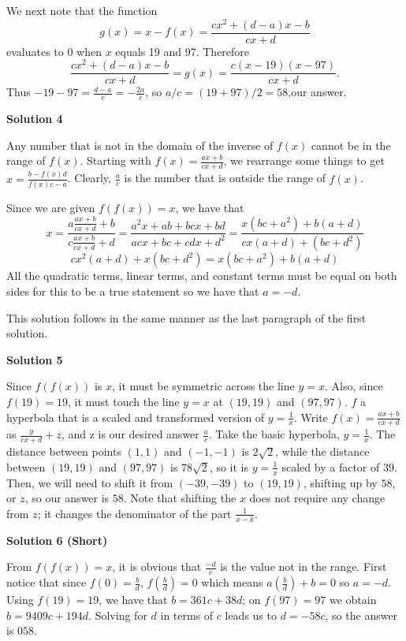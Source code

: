 \begin{enumerate}
 We next note that the function
 \[g(x) =  x - f(x) = \frac{c x^2 + (d-a) x - b}{cx + d}\]evaluates to 0 when $x$ equals 19 and 97.  Therefore
 \[\frac{c x^2 + (d-a) x - b}{cx+d} = g(x) = \frac{c(x-19)(x-97)}{cx+d}.\]Thus $-19 - 97 = \frac{d-a}{c} = -\frac{2a}{c}$, so $a/c = (19+97)/2 = 58$,our answer.

 



\textbf{Solution 4}

Any number that is not in the domain of the inverse of $f(x)$ cannot be in the range of $f(x)$. Starting with $f(x) = \frac{ax+b}{cx+d}$, we rearrange some things to get $x = \frac{b-f(x)d}{f(x)c-a}$. Clearly, $\frac{a}{c}$ is the number that is outside the range of $f(x)$.

 
Since we are given $f(f(x))=x$, we have that 
 \[x = \frac{a\frac{ax+b}{cx+d}+b}{c\frac{ax+b}{cx+d}+d} = \frac{a^2x +ab+bcx+bd}{acx+bc+cdx+d^2} = \frac{x(bc+a^2)+b(a+d)}{cx(a+d)+(bc+d^2)}\]
 \[cx^2(a+d)+x(bc+d^2) = x(bc+a^2) + b(a+d)\]All the quadratic terms, linear terms, and constant terms must be equal on both sides for this to be a true statement so we have that $a = -d$.

 This solution follows in the same manner as the last paragraph of the first solution.

 



\textbf{Solution 5}

Since $f(f(x))$ is $x$, it must be symmetric across the line $y=x$. Also, since $f(19)=19$, it must touch the line $y=x$ at $(19,19)$ and $(97,97)$. $f$ a hyperbola that is a scaled and transformed version of $y=\frac{1}{x}$. Write $f(x)= \frac{ax+b}{cx+d}$ as $\frac{y}{cx+d}+z$, and z is our desired answer $\frac{a}{c}$. Take the basic hyperbola, $y=\frac{1}{x}$. The distance between points $(1,1)$ and $(-1,-1)$ is $2\sqrt{2}$, while the distance between $(19,19)$ and $(97,97)$ is $78\sqrt{2}$, so it is $y=\frac{1}{x}$ scaled by a factor of $39$. Then, we will need to shift it from $(-39,-39)$ to $(19,19)$, shifting up by $58$, or $z$, so our answer is $\boxed{58}$. Note that shifting the $x$ does not require any change from $z$; it changes the denominator of the part $\frac{1}{x-k}$.

 



\textbf{Solution 6 (Short)}

From $f(f(x))=x$, it is obvious that $\frac{-d}{c}$ is the value not in the range. First notice that since $f(0)=\frac{b}{d}$, $f(\frac{b}{d})=0$ which means $a(\frac{b}{d})+b=0$ so $a=-d$. Using $f(19)=19$, we have that $b=361c+38d$; on $f(97)=97$ we obtain $b=9409c+194d$. Solving for $d$ in terms of $c$ leads us to $d=-58c$, so the answer is $\boxed{058}$. 


\end{enumerate}
